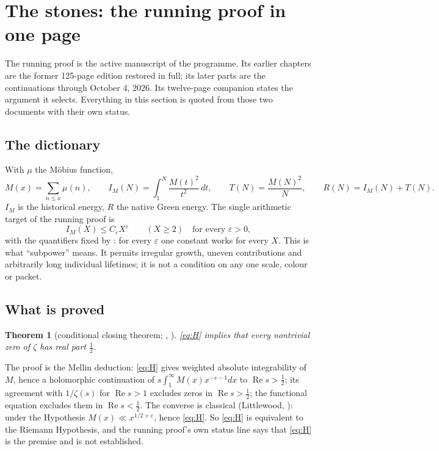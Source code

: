 \documentclass[11pt]{article}
\newtheorem{theorem}{Theorem}[section]
\theoremstyle{definition}
\theoremstyle{remark}
\newcommand{\Ree}{\operatorname{Re}}
\begin{document}
\section{The stones: the running proof in one page}\label{sec:stones}

The running proof \cite{running} is the active manuscript of the programme. Its earlier chapters are the former 125-page edition restored in full; its later parts are the continuations through October 4, 2026. Its twelve-page companion \cite{summary} states the argument it selects. Everything in this section is quoted from those two documents with their own status.

\subsection{The dictionary}
With $\mu$ the Möbius function,
\[
M(x)=\sum_{n\le x}\mu(n),\qquad I_M(N)=\int_1^N\frac{M(t)^2}{t^2}\,dt,\qquad T(N)=\frac{M(N)^2}{N},\qquad R(N)=I_M(N)+T(N).
\]
$I_M$ is the historical energy, $R$ the native Green energy. The single arithmetic target of the running proof is
\begin{equation}\label{eq:H}\tag{H}
I_M(X)\le C_\varepsilon X^{\varepsilon}\qquad(X\ge2)\quad\text{for every }\varepsilon>0,
\end{equation}
with the quantifiers fixed by \cite[\S2]{summary}: for every $\varepsilon$ one constant works for every $X$. This is what ``subpower'' means. It permits irregular growth, uneven contributions and arbitrarily long individual lifetimes; it is not a condition on any one scale, colour or packet.

\subsection{What is proved}
\begin{theorem}[conditional closing theorem; {\cite[\S11]{summary}}, {\cite[Part 0]{running}}]\label{thm:closing}
\eqref{eq:H} implies that every nontrivial zero of $\zeta$ has real part $\tfrac12$.
\end{theorem}
The proof is the Mellin deduction: \eqref{eq:H} gives weighted absolute integrability of $M$, hence a holomorphic continuation of $s\int_1^\infty M(x)x^{-s-1}dx$ to $\Ree s>\tfrac12$; its agreement with $1/\zeta(s)$ for $\Ree s>1$ excludes zeros in $\Ree s>\tfrac12$; the functional equation excludes them in $\Ree s<\tfrac12$. The converse is classical (Littlewood, \cite[\S14.25]{titchmarsh}): under the Hypothesis $M(x)\ll x^{1/2+\varepsilon}$, hence \eqref{eq:H}. So \eqref{eq:H} is equivalent to the Riemann Hypothesis, and the running proof's own status line says that \eqref{eq:H} is the premise and is not established.
\end{document}
